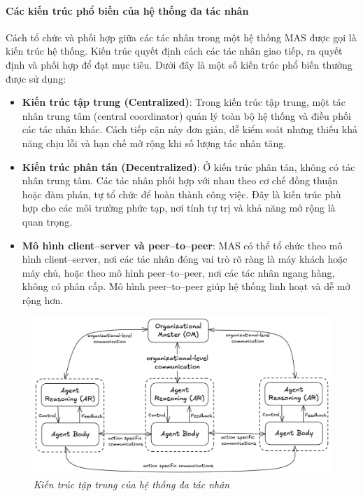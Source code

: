 \documentclass{article}
\begin{document}
\paragraph{Các kiến trúc phổ biến của hệ thống đa tác nhân}

Cách tổ chức và phối hợp giữa các tác nhân trong một hệ thống MAS được gọi là kiến trúc hệ thống. Kiến trúc quyết định cách các tác nhân giao tiếp, ra quyết định và phối hợp để đạt mục tiêu. Dưới đây là một số kiến trúc phổ biến thường được sử dụng:

\begin{itemize}[topsep=0pt, itemsep=2pt, leftmargin=40pt]
    \item \textbf{Kiến trúc tập trung (Centralized)}: Trong kiến trúc tập trung, một tác nhân trung tâm (central coordinator) quản lý toàn bộ hệ thống và điều phối các tác nhân khác. Cách tiếp cận này đơn giản, dễ kiểm soát nhưng thiếu khả năng chịu lỗi và hạn chế mở rộng khi số lượng tác nhân tăng.
    \item \textbf{Kiến trúc phân tán (Decentralized)}: Ở kiến trúc phân tán, không có tác nhân trung tâm. Các tác nhân phối hợp với nhau theo cơ chế đồng thuận hoặc đàm phán, tự tổ chức để hoàn thành công việc. Đây là kiến trúc phù hợp cho các môi trường phức tạp, nơi tính tự trị và khả năng mở rộng là quan trọng.
    \item \textbf{Mô hình client–server và peer–to–peer}: MAS có thể tổ chức theo mô hình client–server, nơi các tác nhân đóng vai trò rõ ràng là máy khách hoặc máy chủ, hoặc theo mô hình peer–to–peer, nơi các tác nhân ngang hàng, không có phân cấp. Mô hình peer–to–peer giúp hệ thống linh hoạt và dễ mở rộng hơn.
\end{itemize}

\begin{figure}[H]
    \centering
    \includegraphics[width=1\linewidth]{img/centralized-mas.png}
    \caption{\centering\textit{Kiến trúc tập trung của hệ thống đa tác nhân}}
    \label{fig:centralized-mas}
\end{figure}
\end{document}

